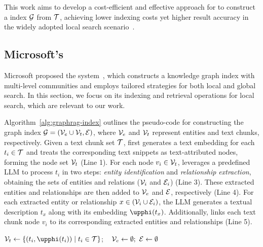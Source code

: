 This work aims to develop a cost-efficient and effective approach for \graphrag to construct a \textgraph{} index $\mathcal{G}$ from $\mathcal{T}$, achieving lower indexing costs yet higher result accuracy in the widely adopted local search scenario~\cite{li2024dalk,delile2024graph,edge2024local,gutierrez2024hipporag}.


\subsection{Microsoft's \graphrag}\label{sec:ms-graphrag}
Microsoft proposed the \graphrag system~\cite{edge2024local}, which constructs a knowledge graph index with multi-level communities and employs tailored strategies for both local and global search. In this section, we focus on its indexing and retrieval operations for local search, which are relevant to our work.


Algorithm~\ref{alg:graphrag-index} outlines the pseudo-code for constructing the graph index $\mathcal{G} = (\mathcal{V}_e \cup \mathcal{V}_t, \mathcal{E})$, where $\mathcal{V}_e$ and $\mathcal{V}_t$ represent entities and text chunks, respectively. Given a text chunk set $\mathcal{T}$, \graphindex first generates a text embedding for each $t_i \in \mathcal{T}$ and treats the corresponding text snippets as text-attributed nodes, forming the node set $\mathcal{V}_t$ (Line 1).  
For each node $v_i \in \mathcal{V}_t$, \graphindex leverages a predefined LLM to process $t_i$ in two steps: \textit{entity identification} and \textit{relationship extraction}, obtaining the sets of entities and relations ($\mathcal{V}_i$ and $\mathcal{E}_i$) (Line 3). These extracted entities and relationships are then added to $\mathcal{V}_e$ and $\mathcal{E}$, respectively (Line 4). 
For each extracted entity or relationship $x \in (\mathcal{V}_i \cup \mathcal{E}_i)$, the LLM generates a textual description $t_x$ along with its embedding $\temb{t_x}$. Additionally, \graphindex links each text chunk node $v_i$ to its corresponding extracted entities and relationships (Line 5).


\begin{algorithm}[!t]
$\V_t \gets \{(t_i,\temb{t_i})\mid t_i\in \Tset\}$; ~ $\mathcal{V}_e \gets \emptyset; ~ \mathcal{E} \gets \emptyset$\;
\caption{\graphindex $(\Tset)$}
\label{alg:graphrag-index}
\end{algorithm}



